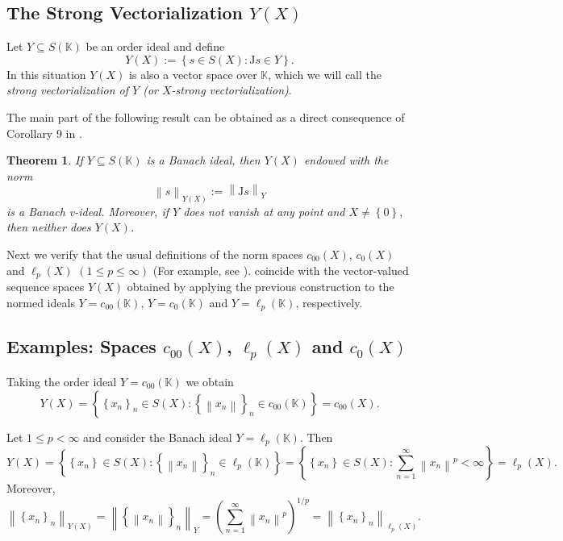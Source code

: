 \documentclass[14pt, a4paper]{article}  %
\providecommand{\llave}[1]{\left\lbrace #1\right\rbrace }
\providecommand{\pare}[1]{\left( #1\right) }
\providecommand{\norm}[1]{\left\lVert#1\right\rVert}
\newcommand{\K}{\mathbb{K}}
\newcommand{\J}{\mathrm{J}}
\newtheorem{theorem}{Theorem}[section]
\begin{document}
	\subsection{The Strong Vectorialization $Y\pare{X}$}\label{sec8}
	

	
	
	
	Let $Y\subseteq S(\K)$ be an order ideal  and define
	\begin{equation}\label{d136}
		Y(X):=\llave{s\in S(X):\J s\in Y}.
	\end{equation}   In this situation $Y(X)$ is also a vector space over $\K$, which we will call  the \emph{strong vectorialization of $Y$ (or $X$-strong vectorialization)}.
	
	
	The main part of the following result can be obtained as a direct  consequence of Corollary 9 in \cite[p. 811]{V}.  
	
	\begin{theorem}\label{piz24}
		If $Y\subseteq S(\K)$ is a Banach ideal, then $Y(X)$ endowed with the norm
		\begin{equation}
			\norm{s}_{Y(X)}:=\norm{\J s}_Y
		\end{equation}
		is a  Banach v-ideal. Moreover, if $Y$ does not vanish at any point and $X\neq \llave{0}$, then neither does $Y\pare{X}$. 
	\end{theorem}
	
	Next we verify that the usual definitions of the norm spaces  $c_{00}(X)$, $c_{0}(X)$ and $\ell_{p}(X)$ $(1\le p\le \infty)$ (For example, see \cite[p. 32]{DJT}). coincide with the vector-valued sequence spaces $Y(X)$ obtained by applying the previous construction to the normed ideals $Y = c_{00} (\K)$, $Y=c_{0}(\K)$ and $Y=\ell_{p}(\K)$, respectively.
	
	
	\subsection{Examples: Spaces $c_{00}(X)$, $\ell_p(X)$ and $c_0(X)$}
	
	Taking the order ideal $Y=c_{00}(\K)$ we obtain
	\[
	Y(X)=\llave{\llave{x_n}_n\in S(X):\llave{\norm{x_n}}_n\in c_{00}(\K)}=c_{00}(X).
	\]
	
	Let $1\le p<\infty$ and consider the Banach ideal $Y=\ell_p(\K)$. Then 
	\begin{equation}
		Y(X) =\llave{\llave{x_n}\in S(X):\llave{\norm{x_n}}_n\in\ell_p(\K)} =\llave{\llave{x_n}\in S(X):\sum_{n=1}^{\infty}\norm{x_n}^p<\infty}
		=\ell_p(X).
	\end{equation}
	Moreover,
	\begin{equation}
		\norm{\llave{x_n}_n}_{Y(X)}
		=\norm{\llave{\norm{x_n}}_n}_{Y}
		=\left(\sum_{n=1}^{\infty}\norm{x_n}^p\right)^{1/p}
		=\norm{\llave{x_n}_n}_{\ell_p(X)} .
	\end{equation}
	
\end{document}
